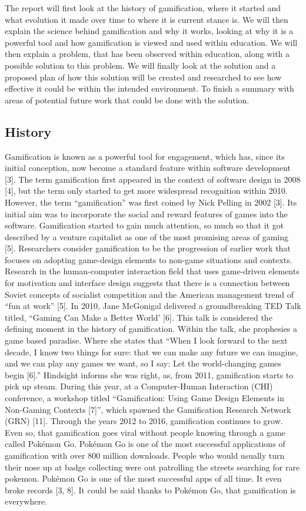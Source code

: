 \documentclass{sigchi}
\begin{document}
The report will first look at the history of gamification, where it started and what evolution it made over time to where it is current stance is. We will then explain the science behind gamification and why it works, looking at why it is a powerful tool and how gamification is viewed and used within education. We will then explain a problem, that has been observed within education, along with a possible solution to this problem. We will finally look at the solution and a proposed plan of how this solution will be created and researched to see how effective it could be within the intended environment. To finish a summary with areas of potential future work that could be done with the solution.

\subsection{History}

Gamification is known as a powerful tool for engagement, which has, since its initial conception, now become a standard feature within software development [3]. The term gamification first appeared in the context of software design in 2008 [4], but the term only started to get more widespread recognition within 2010. However, the term “gamification” was first coined by Nick Pelling in 2002 [3]. Its initial aim was to incorporate the social and reward features of games into the software. Gamification started to gain much attention, so much so that it got described by a venture capitalist as one of the most promising areas of gaming [5]. 
Researchers consider gamification to be the progression of earlier work that focuses on adopting game-design elements to non-game situations and contexts. Research in the human-computer interaction field that uses game-driven elements for motivation and interface design suggests that there is a connection between Soviet concepts of socialist competition and the American management trend of “fun at work” [5]. 
In 2010, Jane McGonigal delivered a groundbreaking TED Talk titled, “Gaming Can Make a Better World’ [6]. This talk is considered the defining moment in the history of gamification. Within the talk, she prophesies a game based paradise. Where she states that “When I look forward to the next decade, I know two things for sure: that we can make any future we can imagine, and we can play any games we want, so I say: Let the world-changing games begin [6].” Hindsight informs she was right, as, from 2011, gamification starts to pick up steam. During this year, at a Computer-Human Interaction (CHI) conference, a workshop titled “Gamification: Using Game Design Elements in Non-Gaming Contexts [7]”, which spawned the Gamification Research Network (GRN) [11]. Through the years 2012 to 2016, gamification continues to grow. Even so, that gamification goes viral without people knowing through a game called Pokémon Go. Pokémon Go is one of the most successful applications of gamification with over 800 million downloads. People who would usually turn their nose up at badge collecting were out patrolling the streets searching for rare pokemon. Pokémon Go is one of the most successful apps of all time. It even broke records [3, 8]. It could be said thanks to Pokémon Go, that gamification is everywhere. 
\end{document}
